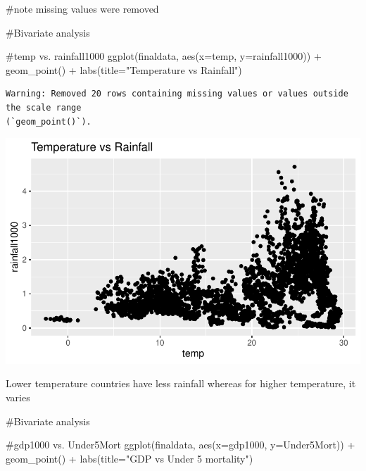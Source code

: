\documentclass[
  letterpaper,
  DIV=11,
  numbers=noendperiod]{scrartcl}
\newenvironment{Shaded}{\begin{snugshade}}{\end{snugshade}}
\newcommand{\AttributeTok}[1]{\textcolor[rgb]{0.40,0.45,0.13}{#1}}
\newcommand{\CommentTok}[1]{\textcolor[rgb]{0.37,0.37,0.37}{#1}}
\newcommand{\FunctionTok}[1]{\textcolor[rgb]{0.28,0.35,0.67}{#1}}
\newcommand{\NormalTok}[1]{\textcolor[rgb]{0.00,0.23,0.31}{#1}}
\newcommand{\SpecialCharTok}[1]{\textcolor[rgb]{0.37,0.37,0.37}{#1}}
\newcommand{\StringTok}[1]{\textcolor[rgb]{0.13,0.47,0.30}{#1}}
\begin{document}
\begin{Shaded}
\begin{Highlighting}[]
\CommentTok{\#note missing values were removed}
\end{Highlighting}
\end{Shaded}

\begin{Shaded}
\begin{Highlighting}[]
\CommentTok{\#Bivariate analysis}

\CommentTok{\#temp vs. rainfall1000}
\FunctionTok{ggplot}\NormalTok{(finaldata, }\FunctionTok{aes}\NormalTok{(}\AttributeTok{x=}\NormalTok{temp, }\AttributeTok{y=}\NormalTok{rainfall1000)) }\SpecialCharTok{+} 
  \FunctionTok{geom\_point}\NormalTok{() }\SpecialCharTok{+} 
  \FunctionTok{labs}\NormalTok{(}\AttributeTok{title=}\StringTok{"Temperature vs Rainfall"}\NormalTok{)}
\end{Highlighting}
\end{Shaded}

\begin{verbatim}
Warning: Removed 20 rows containing missing values or values outside the scale range
(`geom_point()`).
\end{verbatim}

\includegraphics{week4_eda_inclass_files/figure-pdf/unnamed-chunk-8-1.pdf}

Lower temperature countries have less rainfall whereas for higher
temperature, it varies

\begin{Shaded}
\begin{Highlighting}[]
\CommentTok{\#Bivariate analysis}

\CommentTok{\#gdp1000 vs. Under5Mort}
\FunctionTok{ggplot}\NormalTok{(finaldata, }\FunctionTok{aes}\NormalTok{(}\AttributeTok{x=}\NormalTok{gdp1000, }\AttributeTok{y=}\NormalTok{Under5Mort)) }\SpecialCharTok{+} 
  \FunctionTok{geom\_point}\NormalTok{() }\SpecialCharTok{+} 
  \FunctionTok{labs}\NormalTok{(}\AttributeTok{title=}\StringTok{"GDP vs Under 5 mortality"}\NormalTok{)}
\end{Highlighting}
\end{Shaded}
\end{document}
